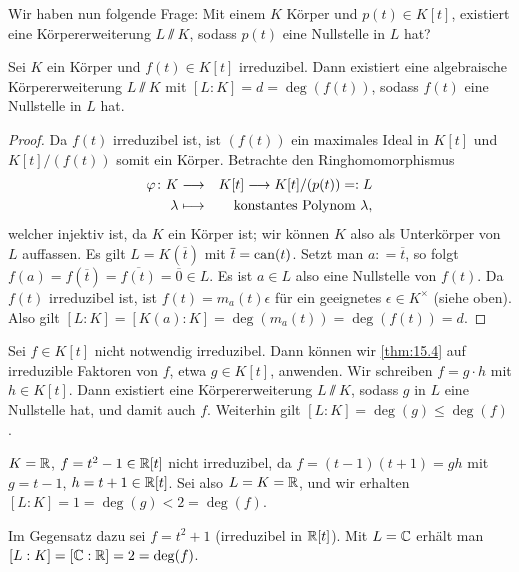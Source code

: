 \documentclass[12pt,a4paper]{scrartcl}
\begin{document}
Wir haben nun folgende Frage: Mit einem $K$ Körper und $p(t)\in K[t]$, existiert eine Körpererweiterung $L\sslash K$, sodass $p(t)$ eine Nullstelle in $L$ hat?

\begin{satz} \label{thm:15.4}
	Sei $K$ ein Körper und $f(t)\in K[t]$ irreduzibel. Dann existiert eine algebraische Körpererweiterung $L\sslash K$ mit $[L:K]  = d = \deg(f(t))$, sodass $f(t)$ eine Nullstelle in $L$ hat.
\end{satz}
\begin{proof}
	Da $f(t)$ irreduzibel ist, ist $(f(t))$ ein maximales Ideal in $K[t]$ und $K[t]/(f(t))$ somit ein Körper. Betrachte den Ringhomomorphismus 
	\begin{eqnarray*}
	\varphi\colon K&\longrightarrow& K[t]\longrightarrow K[t]/(p(t)) = : L\\
	\lambda &\longmapsto & \text{konstantes Polynom $\lambda$},
	\end{eqnarray*}
	welcher injektiv ist, da $K$ ein Körper ist; wir können $K$ also als Unterkörper von $L$ auffassen. Es gilt $L = K(\overline{t})$ mit $\overline{t}  = \operatorname{can} (t)$. Setzt man $a: = \overline{t}$, so folgt $f(a) = f(\overline{t}) = \overline{f(t)} = \overline{0}\in L$. Es ist $a\in L$ also eine Nullstelle von $f(t)$. Da $f(t)$ irreduzibel ist, ist $f(t) = m_a(t)\epsilon$ für ein geeignetes $\epsilon \in K^{\times}$ (siehe oben). Also gilt $[L:K] = [K(a):K] = \deg(m_a(t)) = \deg(f(t)) = d$.
\end{proof}	



\begin{bem}
	Sei $f\in K[t]$ nicht notwendig irreduzibel. Dann können wir \cref{thm:15.4} auf irreduzible Faktoren von $f$, etwa $g\in K[t]$, anwenden. Wir schreiben $f = g\cdot h$ mit $h \in K[t]$. Dann existiert eine Körpererweiterung $L\sslash K$, sodass $g$ in $L$ eine Nullstelle hat, und damit auch $f$. Weiterhin gilt $[L:K] = \deg(g)\leq \deg (f)$.
\end{bem}
\begin{bsp} $K = \mathbb R$, $f= t^2-1\in \mathbb R[t]$ nicht irreduzibel, da $f = (t-1)(t+1) = gh$ mit $g = t-1$, $h = t+1\in\mathbb R[t]$. Sei also $L = K = \mathbb R$, und wir erhalten $[L:K] = 1 = \deg(g)<2 = \deg(f)$.

Im Gegensatz dazu sei $f = t^2+1$ (irreduzibel in $\mathbb R[t]$). Mit $L =\mathbb C$ erhält man $[L:K] = [\mathbb C:\mathbb R] = 2 = \deg(f)$.
\end{bsp}
	
\end{document}
